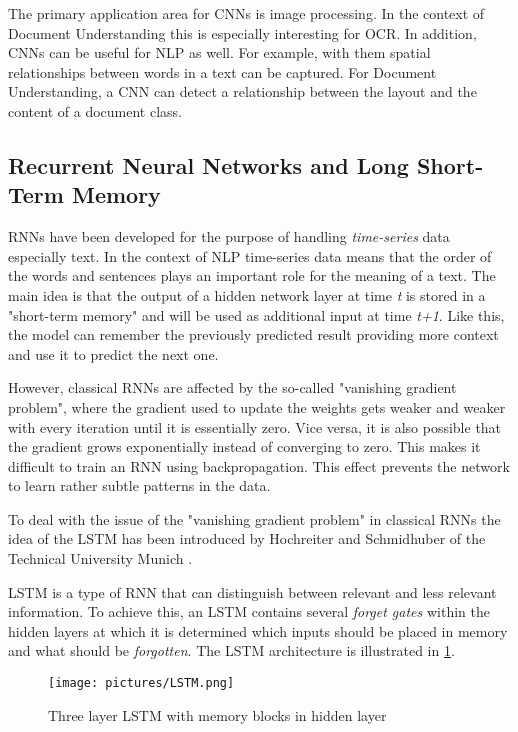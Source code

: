 The primary application area for \acp{CNN} is image processing. In the context of Document Understanding this is especially interesting for \ac{OCR}.
In addition, \acp{CNN} can be useful for \ac{NLP} as well. For example, with them spatial relationships between words in a text can be captured. For Document Understanding, a \ac{CNN} can detect a relationship between the layout and the content of a document class.
\cite{lecun1998gradient,leiAI}

\subsection{Recurrent Neural Networks and Long Short-Term Memory}

\acp{RNN} have been developed for the purpose of handling \textit{time-series} data especially text. In the context of \ac{NLP} time-series data means that the order of the words and sentences plays an important role for the meaning of a text. 
The main idea is that the output of a hidden network layer at time \textit{t} is stored in a "short-term memory" and will be used as additional input at time \textit{t+1}. Like this, the model can remember the previously predicted result providing more context and use it to predict the next one. \cite{hochreiter1997long,gers2000learning}

However, classical \acp{RNN} are affected by the so-called "vanishing gradient problem", where the gradient used to update the weights gets weaker and weaker with every iteration until it is essentially zero. Vice versa, it is also possible that the gradient grows exponentially instead of converging to zero. This makes it difficult to train an \ac{RNN} using backpropagation. This effect prevents the network to learn rather subtle patterns in the data. \cite{hochreiter2001gradient}

To deal with the issue of the "vanishing gradient problem" in classical \acp{RNN} the idea of the \ac{LSTM} has been introduced by Hochreiter and Schmidhuber of the Technical University Munich \cite{hochreiter1997long}. 

\ac{LSTM} is a type of \ac{RNN} that can distinguish between relevant and less relevant information. To achieve this, an \ac{LSTM} contains several \textit{forget gates} within the hidden layers at which it is determined which inputs should be placed in memory and what should be \textit{forgotten}. The \ac{LSTM} architecture is illustrated in \cref{pic:LSTM}.

\begin{figure}[ht]
    \centering 
    \texttt{[image: pictures/LSTM.png]}
    \caption{Three layer LSTM with memory blocks in hidden layer \cite{gers2000learning}}
    \label{pic:LSTM}    %
\end{figure}

